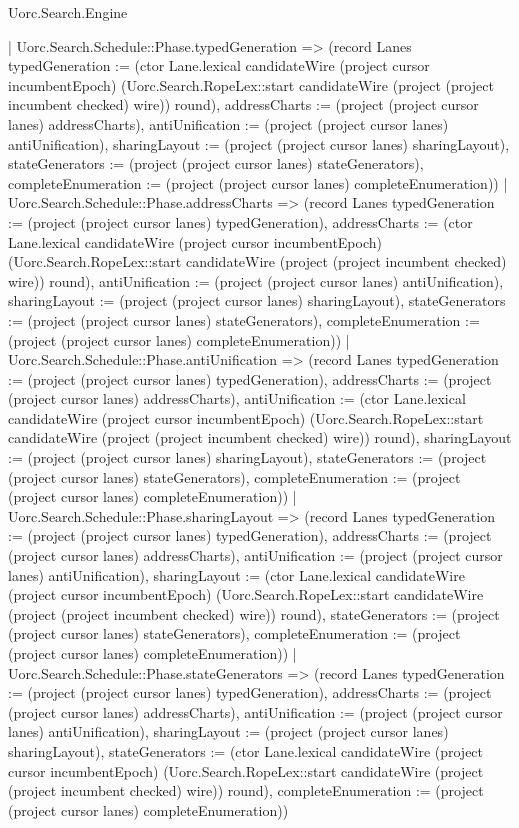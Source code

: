 \begin{lexlean}{Uorc.Search.Engine}
\begin{semanticmodule}
{{      | Uorc.Search.Schedule::Phase.typedGeneration => (record Lanes {typedGeneration := (ctor Lane.lexical candidateWire (project cursor incumbentEpoch) (Uorc.Search.RopeLex::start candidateWire (project (project incumbent checked) wire)) round), addressCharts := (project (project cursor lanes) addressCharts), antiUnification := (project (project cursor lanes) antiUnification), sharingLayout := (project (project cursor lanes) sharingLayout), stateGenerators := (project (project cursor lanes) stateGenerators), completeEnumeration := (project (project cursor lanes) completeEnumeration)})
      | Uorc.Search.Schedule::Phase.addressCharts => (record Lanes {typedGeneration := (project (project cursor lanes) typedGeneration), addressCharts := (ctor Lane.lexical candidateWire (project cursor incumbentEpoch) (Uorc.Search.RopeLex::start candidateWire (project (project incumbent checked) wire)) round), antiUnification := (project (project cursor lanes) antiUnification), sharingLayout := (project (project cursor lanes) sharingLayout), stateGenerators := (project (project cursor lanes) stateGenerators), completeEnumeration := (project (project cursor lanes) completeEnumeration)})
      | Uorc.Search.Schedule::Phase.antiUnification => (record Lanes {typedGeneration := (project (project cursor lanes) typedGeneration), addressCharts := (project (project cursor lanes) addressCharts), antiUnification := (ctor Lane.lexical candidateWire (project cursor incumbentEpoch) (Uorc.Search.RopeLex::start candidateWire (project (project incumbent checked) wire)) round), sharingLayout := (project (project cursor lanes) sharingLayout), stateGenerators := (project (project cursor lanes) stateGenerators), completeEnumeration := (project (project cursor lanes) completeEnumeration)})
      | Uorc.Search.Schedule::Phase.sharingLayout => (record Lanes {typedGeneration := (project (project cursor lanes) typedGeneration), addressCharts := (project (project cursor lanes) addressCharts), antiUnification := (project (project cursor lanes) antiUnification), sharingLayout := (ctor Lane.lexical candidateWire (project cursor incumbentEpoch) (Uorc.Search.RopeLex::start candidateWire (project (project incumbent checked) wire)) round), stateGenerators := (project (project cursor lanes) stateGenerators), completeEnumeration := (project (project cursor lanes) completeEnumeration)})
      | Uorc.Search.Schedule::Phase.stateGenerators => (record Lanes {typedGeneration := (project (project cursor lanes) typedGeneration), addressCharts := (project (project cursor lanes) addressCharts), antiUnification := (project (project cursor lanes) antiUnification), sharingLayout := (project (project cursor lanes) sharingLayout), stateGenerators := (ctor Lane.lexical candidateWire (project cursor incumbentEpoch) (Uorc.Search.RopeLex::start candidateWire (project (project incumbent checked) wire)) round), completeEnumeration := (project (project cursor lanes) completeEnumeration)})
}}
\end{semanticmodule}
\end{lexlean}
